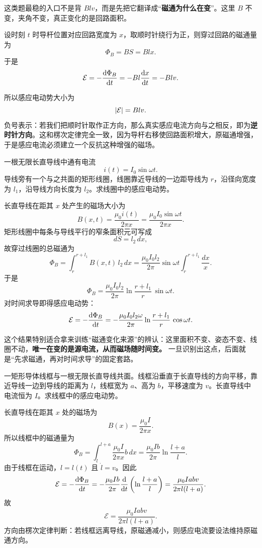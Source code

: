 \documentclass[lang=cn,11pt]{elegantbook}
\begin{document}
\begin{solution}
这类题最稳的入口不是背 \(Blv\)，而是先把它翻译成“\textbf{磁通为什么在变}”。这里 \(B\) 不变，夹角不变，真正变化的是回路面积。

设时刻 \(t\) 时导杆位置对应回路宽度为 \(x\)，取顺时针绕行为正，则穿过回路的磁通量为
\[
\Phi_B=BS=Blx.
\]
于是
\[
\mathcal{E}=-\dv{\Phi_B}{t}
=-Bl\dv{x}{t}
=-Blv.
\]

所以感应电动势大小为
\[
\abs{\mathcal{E}}=Blv.
\]
负号表示：若我们把顺时针取作正方向，那么真实感应电流方向与之相反，即为\textbf{逆时针方向}。这和楞次定律完全一致，因为导杆右移使回路面积增大，原磁通增强，于是感应电流必须建立一个反抗这种增强的磁场。
\end{solution}

\begin{example}[时变长直电流在线圈中激发的感应电动势]
一根无限长直导线中通有电流
\[
i(t)=I_0\sin\omega t.
\]
导线旁有一个与之共面的矩形线圈，线圈靠近导线的一边距导线为 \(r\)，沿径向宽度为 \(l_1\)，沿导线方向长度为 \(l_2\)。求线圈中的感应电动势。
\end{example}

\begin{solution}
长直导线在距其 \(x\) 处产生的磁场大小为
\[
B(x,t)=\frac{\mu_0 i(t)}{2\pi x}
=\frac{\mu_0 I_0\sin\omega t}{2\pi x}.
\]
矩形线圈中每条与导线平行的窄条面积元可写成
\[
dS=l_2\,dx,
\]
故穿过线圈的总磁通为
\[
\Phi_B
=\int_r^{r+l_1} B(x,t)\,l_2\,dx
=\frac{\mu_0 I_0l_2}{2\pi}\sin\omega t
\int_r^{r+l_1}\frac{dx}{x}.
\]
于是
\[
\Phi_B
=\frac{\mu_0 I_0l_2}{2\pi}\ln\frac{r+l_1}{r}\,\sin\omega t.
\]
对时间求导即得感应电动势：
\[
\mathcal{E}
=-\dv{\Phi_B}{t}
=-\frac{\mu_0 I_0l_2\omega}{2\pi}\ln\frac{r+l_1}{r}\,\cos\omega t.
\]

这个结果特别适合拿来训练“磁通变化来源”的辨认：这里面积不变、姿态不变、线圈不动，\textbf{唯一在变的是源电流，从而磁场随时间变。} 一旦识别出这点，后面就是“先求磁通，再对时间求导”的固定套路。
\end{solution}

\begin{example}[运动矩形线框在长直电流磁场中的感应电动势]
一矩形导体线框与一根无限长直导线共面。线框沿垂直于长直导线的方向平移，靠近导线一边到导线的距离为 \(l\)，线框宽为 \(a\)、高为 \(b\)，平移速度为 \(v\)。长直导线中电流恒为 \(I\)。求线框中的感应电动势。
\end{example}

\begin{solution}
长直导线在距其 \(x\) 处的磁场为
\[
B(x)=\frac{\mu_0I}{2\pi x}.
\]
所以线框中的磁通量为
\[
\Phi_B=\int_l^{l+a}\frac{\mu_0I}{2\pi x}b\,dx
=\frac{\mu_0Ib}{2\pi}\ln\frac{l+a}{l}.
\]
由于线框在运动，\(l=l(t)\) 且 \(\dot l=v\)。因此
\[
\mathcal{E}=-\dv{\Phi_B}{t}
=-\frac{\mu_0Ib}{2\pi}\dv{}{t}\left(\ln\frac{l+a}{l}\right)
=\frac{\mu_0Iabv}{2\pi l(l+a)}.
\]
故
\[
\boxed{
\mathcal{E}=\frac{\mu_0Iabv}{2\pi l(l+a)}
}.
\]
方向由楞次定律判断：若线框远离导线，原磁通减小，则感应电流要设法维持原磁通方向。
\end{solution}
\end{document}

